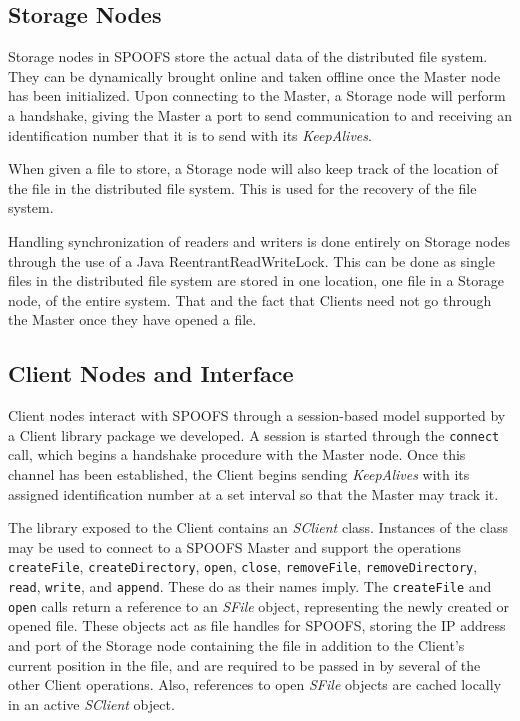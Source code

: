 \subsection{Storage Nodes}

Storage nodes in SPOOFS store the actual data of the distributed file system. They can be dynamically brought online and taken offline once the Master node has been initialized. Upon connecting to the Master, a Storage node will perform a handshake, giving the Master a port to send communication to and receiving an identification number that it is to send with its \textit{KeepAlives}.

When given a file to store, a Storage node will also keep track of the location of the file in the distributed file system. This is used for the recovery of the file system.

Handling synchronization of readers and writers is done entirely on Storage nodes through the use of a Java ReentrantReadWriteLock. This can be done as single files in the distributed file system are stored in one location, one file in a Storage node, of the entire system. That and the fact that Clients need not go through the Master once they have opened a file.

\subsection{Client Nodes and Interface}

Client nodes interact with SPOOFS through a session-based model supported by a Client library package we developed. A session is started through the \texttt{connect} call, which begins a handshake procedure with the Master node. Once this channel has been established, the Client begins sending \textit{KeepAlives} with its assigned identification number at a set interval so that the Master may track it.

The library exposed to the Client contains an \textit{SClient} class. Instances of the class may be used to connect to a SPOOFS Master and support the operations \texttt{createFile}, \texttt{createDirectory}, \texttt{open}, \texttt{close}, \texttt{removeFile}, \texttt{removeDirectory}, \texttt{read}, \texttt{write}, and \texttt{append}. These do as their names imply. The \texttt{createFile} and \texttt{open} calls return a reference to an \textit{SFile} object, representing the newly created or opened file. These objects act as file handles for SPOOFS, storing the IP address and port of the Storage node containing the file in addition to the Client's current position in the file, and are required to be passed in by several of the other Client operations. Also, references to open \textit{SFile} objects are cached locally in an active \textit{SClient} object.

